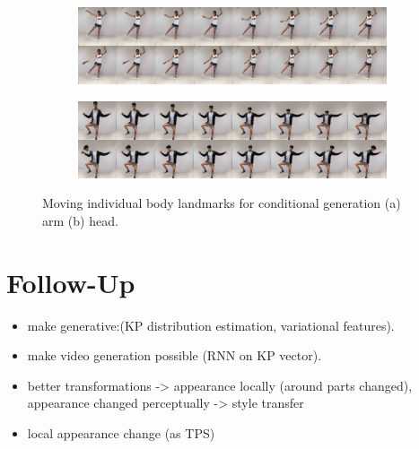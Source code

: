 	\begin{figure}[htp]
		\centering
		\begin{subfigure}{1.\linewidth}
		\includegraphics[trim={0cm 0cm 0cm 0cm},clip, width=1.0\linewidth]{fig/factor/8arm}\caption{}
		\end{subfigure}

		\begin{subfigure}{1.\linewidth}
			\includegraphics[trim={0cm 0cm 0cm 0cm},clip, width=1.0\linewidth]{fig/factor/8head}\caption{}
		\end{subfigure}
		\caption{Moving individual body landmarks for conditional generation (a) arm (b) head.}
		\label{fig:movekp}
	\end{figure}

\section{Follow-Up}
	\begin{itemize}
		\item make generative:(KP distribution estimation, variational features).
		\item make video generation possible (RNN on KP vector).
		\item better transformations -> appearance locally (around parts changed), appearance changed perceptually -> style transfer
		\item local appearance change (as TPS)
	\end{itemize}


